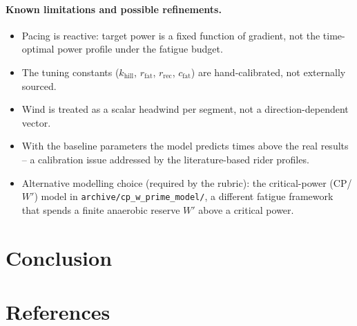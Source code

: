 \documentclass[11pt]{article}
\begin{document}
\paragraph{Known limitations and possible refinements.}
\begin{itemize}
  \item Pacing is reactive: target power is a fixed function of gradient, not the time-optimal power profile under the fatigue budget.
  \item The tuning constants ($k_\mathrm{hill}$, $r_\mathrm{fat}$, $r_\mathrm{rec}$, $c_\mathrm{fat}$) are hand-calibrated, not externally sourced.
  \item Wind is treated as a scalar headwind per segment, not a direction-dependent vector.
  \item With the baseline parameters the model predicts times above the real results -- a calibration issue addressed by the literature-based rider profiles.
  \item Alternative modelling choice (required by the rubric): the critical-power (CP/$W'$) model in \texttt{archive/cp\_w\_prime\_model/}, a different fatigue framework that spends a finite anaerobic reserve $W'$ above a critical power.
\end{itemize}

\section{Conclusion}

\section*{References}
\end{document}
